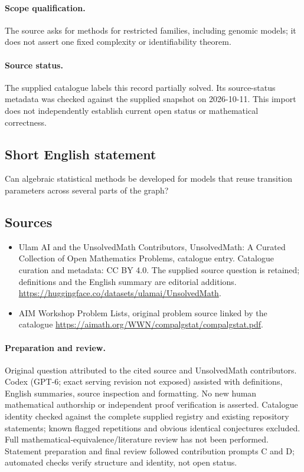 \documentclass[11pt]{article}
\begin{document}
\paragraph{Scope qualification.}
The source asks for methods for restricted families, including genomic models; it does not assert one fixed complexity or identifiability theorem.
\paragraph{Source status.}
The supplied catalogue labels this record partially solved. Its source-status metadata was checked against the supplied snapshot on 2026-10-11. This import does not independently establish current open status or mathematical correctness.
\subsection{Short English statement}
Can algebraic statistical methods be developed for models that reuse transition parameters across several parts of the graph?
\subsection{Sources}
\begin{itemize}
\item[S1] Ulam AI and the UnsolvedMath Contributors, UnsolvedMath: A Curated Collection of Open Mathematics Problems, catalogue entry. Catalogue curation and metadata: CC BY 4.0. The supplied source question is retained; definitions and the English summary are editorial additions.
\url{https://huggingface.co/datasets/ulamai/UnsolvedMath}.
\item[S2] AIM Workshop Problem Lists, original problem source linked by the catalogue
\url{https://aimath.org/WWN/compalgstat/compalgstat.pdf}.
\end{itemize}
\paragraph{Preparation and review.}
Original question attributed to the cited source and UnsolvedMath contributors. Codex (GPT-6; exact serving revision not exposed) assisted with definitions, English summaries, source inspection and formatting. No new human mathematical authorship or independent proof verification is asserted. Catalogue identity checked against the complete supplied registry and existing repository statements; known flagged repetitions and obvious identical conjectures excluded. Full mathematical-equivalence/literature review has not been performed. Statement preparation and final review followed contribution prompts C and D; automated checks verify structure and identity, not open status.
\label{end:statement}
\end{document}
